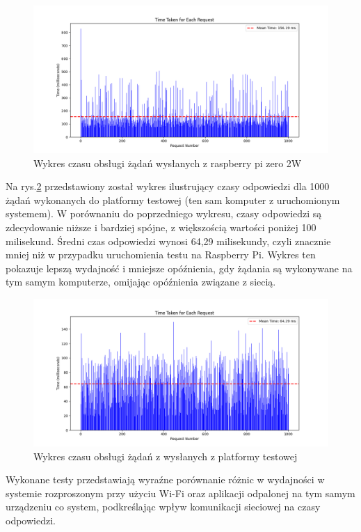 \begin{figure}[!htbp]
    \centering
    \includegraphics[width=\textwidth]{images/testy/tests.png}
    \caption{Wykres czasu obsługi żądań wysłanych z raspberry pi zero 2W}
    \label{testraspberryPiGraph}
\end{figure}

Na rys.\ref{testlocalhostGraph} przedstawiony został wykres ilustrujący czasy odpowiedzi dla 1000 żądań wykonanych do platformy testowej (ten sam komputer z uruchomionym systemem). W porównaniu do poprzedniego wykresu, czasy odpowiedzi są zdecydowanie niższe i bardziej spójne, z większością wartości poniżej 100 milisekund. Średni czas odpowiedzi wynosi 64,29 milisekundy, czyli znacznie mniej niż w przypadku uruchomienia testu na Raspberry Pi. Wykres ten pokazuje lepszą wydajność i mniejsze opóźnienia, gdy żądania są wykonywane na tym samym komputerze, omijając opóźnienia związane z siecią.


\begin{figure}[!htbp]
    \centering
    \includegraphics[width=\textwidth]{images/testy/testsLocalhost.png}
    \caption{Wykres czasu obsługi żądań z wysłanych z platformy testowej}
    \label{testlocalhostGraph}
\end{figure}

Wykonane testy przedstawiają wyraźne porównanie różnic w wydajności w systemie rozproszonym przy użyciu Wi-Fi oraz aplikacji odpalonej na tym samym urządzeniu co system, podkreślając wpływ komunikacji sieciowej na czasy odpowiedzi.